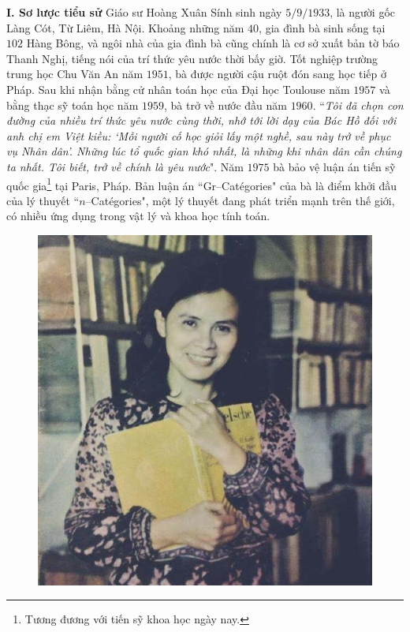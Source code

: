 \begin{multicols}{2}
	\textbf{\color{doisongtoanhoc}I. Sơ lược tiểu sử}
	\vskip 0.1cm
	Giáo sư Hoàng Xuân Sính sinh ngày $5/9/1933$, là người gốc Làng Cót, Từ Liêm, Hà Nội. Khoảng những năm $40$, gia đình bà sinh sống tại $102$ Hàng Bông, và ngôi nhà của gia đình bà cũng chính là cơ sở xuất bản tờ báo Thanh Nghị, tiếng nói của trí thức yêu nước thời bấy giờ.
	\vskip 0.1cm
	Tốt nghiệp trường trung học Chu Văn An năm $1951$, bà được người cậu ruột đón sang học tiếp ở Pháp. Sau khi nhận bằng cử nhân toán học của Đại học Toulouse năm $1957$ và bằng thạc sỹ toán học năm $1959$, bà trở về nước đầu năm $1960$.
	\vskip 0.1cm
	``\textit{Tôi đã chọn con đường của nhiều trí thức yêu nước cùng thời, nhớ tới lời dạy của Bác Hồ đối với anh chị em Việt kiều: `Mỗi người cố học giỏi lấy một nghề, sau này trở về phục vụ Nhân dân'. Những lúc tổ quốc gian khó nhất, là những khi nhân dân cần chúng ta nhất. Tôi biết, trở về chính là yêu nước}".
	\vskip 0.1cm
	Năm $1975$ bà bảo vệ luận án tiến sỹ quốc gia\footnote[2]{\color{doisongtoanhoc}Tương đương với tiến sỹ
		khoa học ngày nay.} tại Paris, Pháp. Bản luận án ``Gr--Catégories" của bà là điểm khởi đầu của lý thuyết ``$n$--Catégories", một lý thuyết đang phát triển mạnh trên thế giới, có nhiều ứng dụng trong vật lý và khoa học tính toán. 
	\begin{figure}[H]
		\vspace*{-5pt}
		\centering
		\captionsetup{labelformat= empty, justification=centering}
		\includegraphics[width= 1\linewidth]{Anh1}

\end{figure}
\end{multicols}
